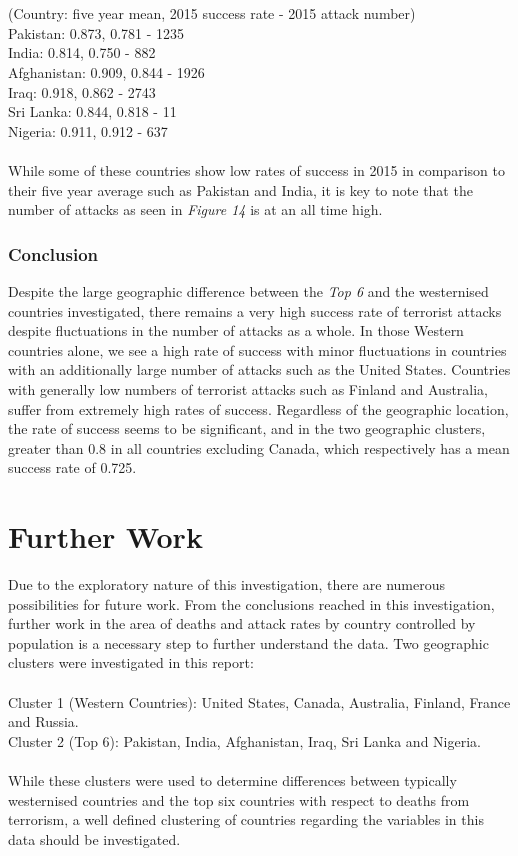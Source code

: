 \documentclass[10pt,a4paper]{article}
\begin{document}
\\\\
\indent \indent(Country: five year mean, 2015 success rate - 2015 attack number) \\
\indent Pakistan: 0.873,  0.781 - 1235  \\
\indent India: 0.814, 0.750 - 882 \\
\indent Afghanistan: 0.909, 0.844 - 1926 \\
\indent Iraq: 0.918, 0.862 - 2743 \\
\indent Sri Lanka: 0.844, 0.818 - 11 \\
\indent Nigeria: 0.911, 0.912 - 637 \\
\\
While some of these countries show low rates of success in 2015 in comparison to their five year average such as Pakistan and India, it is key to note that the number of attacks as seen in \textit{Figure 14} is at an all time high.

\subsubsection{Conclusion}
Despite the large geographic difference between the \textit{Top 6} and the westernised countries investigated, there remains a very high success rate of terrorist attacks despite fluctuations in the number of attacks as a whole.
In those Western countries alone, we see a high rate of success with minor fluctuations in countries with an additionally large number of attacks such as the United States.
Countries with generally low numbers of terrorist attacks such as Finland and Australia, suffer from extremely high rates of success.
Regardless of the geographic location, the rate of success seems to be significant, and in the two geographic clusters, greater than 0.8 in all countries excluding Canada, which respectively has a mean success rate of 0.725.


\section{Further Work} 
Due to the exploratory nature of this investigation, there are numerous possibilities for future work.
From the conclusions reached in this investigation, further work in the area of deaths and attack rates by country controlled by population is a necessary step to further understand the data.
Two geographic clusters were investigated in this report:
\\\\
\indent Cluster 1 (Western Countries): United States, Canada, Australia, Finland, France and Russia. \\
\indent Cluster 2 (Top 6): Pakistan, India, Afghanistan, Iraq, Sri Lanka and Nigeria.
\\\\
While these clusters were used to determine differences between typically westernised countries and the top six countries with respect to deaths from terrorism, a well defined clustering of countries regarding the variables in this data should be investigated.
\end{document}
